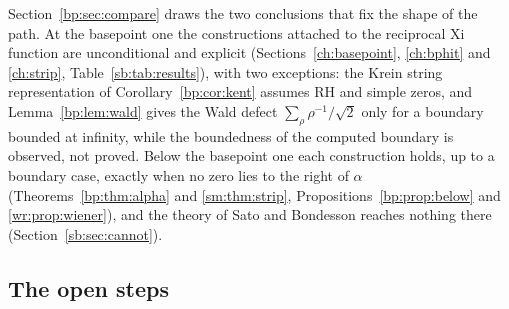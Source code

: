 Section~\ref{bp:sec:compare} draws the two conclusions that fix the shape of the path. At the basepoint one the constructions attached to the reciprocal Xi function are unconditional and explicit (Sections~\ref{ch:basepoint}, \ref{ch:bphit} and \ref{ch:strip}, Table~\ref{sb:tab:results}), with two exceptions: the Krein string representation of Corollary~\ref{bp:cor:kent} assumes RH and simple zeros, and Lemma~\ref{bp:lem:wald} gives the Wald defect $\sum_\rho\rho^{-1}/\sqrt2$ only for a boundary bounded at infinity, while the boundedness of the computed boundary is observed, not proved. Below the basepoint one each construction holds, up to a boundary case, exactly when no zero lies to the right of $\alpha$ (Theorems~\ref{bp:thm:alpha} and \ref{sm:thm:strip}, Propositions~\ref{bp:prop:below} and \ref{wr:prop:wiener}), and the theory of Sato and Bondesson reaches nothing there (Section~\ref{sb:sec:cannot}).

\subsection{The open steps}\label{sec:ch25:open}

